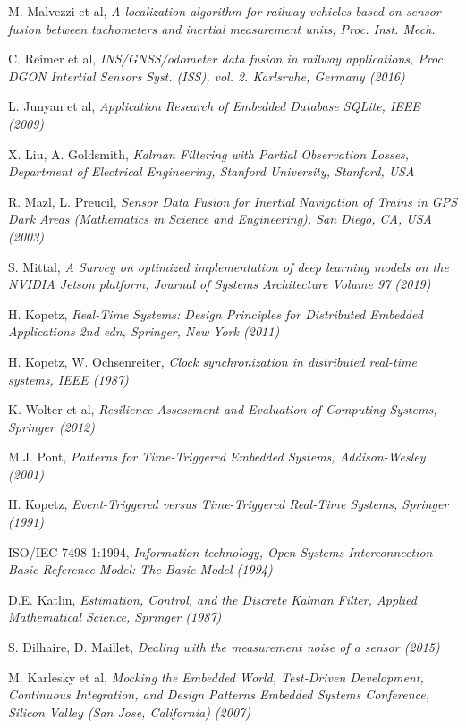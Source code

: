 \begin{thebibliography}{9}
M. Malvezzi et al, \textit{A localization algorithm for railway vehicles based on sensor fusion between tachometers and inertial measurement units, Proc. Inst. Mech.}

C. Reimer et al, \textit{INS/GNSS/odometer
data fusion in railway applications, Proc. DGON Intertial Sensors
Syst. (ISS), vol. 2. Karlsruhe, Germany (2016)} 

L. Junyan et al, \textit{Application Research of Embedded Database SQLite, IEEE (2009)}

X. Liu, A. Goldsmith, \textit{
Kalman  Filtering with Partial Observation Losses, Department of Electrical Engineering, Stanford University, Stanford, USA}

R. Mazl, L. Preucil, \textit{Sensor Data Fusion for Inertial Navigation of
Trains in GPS Dark Areas (Mathematics in Science and Engineering),
San Diego, CA, USA (2003)}

S. Mittal, \textit{A Survey on optimized implementation of deep learning models on the NVIDIA Jetson platform, Journal of Systems Architecture
Volume 97 (2019)}
	

H. Kopetz, \textit{Real-Time Systems: Design Principles for Distributed Embedded Applications 2nd edn, Springer, New York (2011)}

H. Kopetz, W. Ochsenreiter, \textit{Clock synchronization in distributed real-time systems, IEEE (1987)}

K. Wolter et al,
\textit{Resilience Assessment and Evaluation of Computing Systems, Springer (2012)}

M.J. Pont, \emph{Patterns for Time-Triggered Embedded Systems, Addison-Wesley (2001)}

H. Kopetz, \emph{Event-Triggered versus Time-Triggered Real-Time Systems, Springer (1991)}

ISO/IEC 7498-1:1994, \textit{
Information technology, Open Systems Interconnection - Basic Reference Model: The Basic Model (1994)}

D.E. Katlin, \textit{Estimation, Control, and the Discrete Kalman Filter, Applied Mathematical Science, Springer (1987)}

S. Dilhaire, D. Maillet, \textit{Dealing  with the measurement noise of a sensor (2015)}

M. Karlesky et al, \textit{Mocking the Embedded World,
Test-Driven Development, Continuous Integration, and Design Patterns
Embedded Systems Conference, Silicon Valley (San Jose, California)
(2007)}

\end{thebibliography}